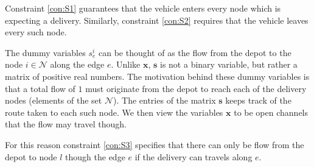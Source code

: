 Constraint \ref{con:S1} guarantees that the vehicle enters every node which is expecting a delivery. Similarly, constraint \ref{con:S2} requires that the vehicle leaves every such node.

The dummy variables $s^i_e$ can be thought of as the flow from the depot to the node $i \in \mathcal{N}$ along the edge $e$. Unlike $\mathbf{x}$, $\mathbf{s}$ is not a binary variable, but rather a matrix of positive real numbers. The motivation behind these dummy variables is that a total flow of $1$ must originate from the depot to reach each of the delivery nodes (elements of the set $\mathcal{N}$). The entries of the matrix $\mathbf{s}$ keeps track of the route taken to each such node. We then view the variables $\mathbf{x}$ to be open channels that the flow may travel though.

For this reason constraint \ref{con:S3} specifies that there can only be flow from the depot to node $l$ though the edge $e$ if the delivery can travels along $e$.